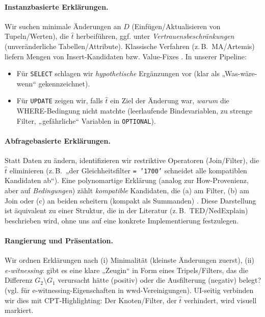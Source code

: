 \paragraph{Instanzbasierte Erklärungen.}
Wir suchen minimale Änderungen an \(D\) (Einfügen/Aktualisieren von Tupeln/Werten), die \(\hat{t}\) herbeiführen, ggf. unter \emph{Vertrauensbeschränkungen} (unveränderliche Tabellen/Attribute). Klassische Verfahren (z.\,B.\ MA/Artemis) liefern Mengen von Insert-Kandidaten bzw. Value-Fixes \cite{herschel2017survey}. In unserer Pipeline:
\begin{itemize}
  \item Für \texttt{SELECT} schlagen wir \emph{hypothetische} Ergänzungen vor (klar als „Was-wäre-wenn“ gekennzeichnet).
  \item Für \texttt{UPDATE} zeigen wir, falls \(\hat{t}\) ein Ziel der Änderung war, \emph{warum} die WHERE-Bedingung nicht matchte (leerlaufende Bindevariablen, zu strenge Filter, „gefährliche“ Variablen in \texttt{OPTIONAL}).
\end{itemize}

\paragraph{Abfragebasierte Erklärungen.}
Statt Daten zu ändern, identifizieren wir restriktive Operatoren (Join/Filter), die \(\hat{t}\) eliminieren (z.\,B.\ „der Gleichheitsfilter \texttt{= '1700'} schneidet alle kompatiblen Kandidaten ab“). Eine polynomartige Erklärung (analog zur How-Provenienz, aber auf \emph{Bedingungen}) zählt \emph{kompatible} Kandidaten, die (a) am Filter, (b) am Join oder (c) an beiden scheitern (kompakt als Summanden) \cite{herschel2017survey}. Diese Darstellung ist äquivalent zu einer Struktur, die in der Literatur (z.\,B.\ TED/NedExplain) beschrieben wird, ohne uns auf eine konkrete Implementierung festzulegen.

\paragraph{Rangierung und Präsentation.}
Wir ordnen Erklärungen nach (i) Minimalität (kleinste Änderungen zuerst), (ii) \emph{e-witnessing}: gibt es eine klare „Zeugin“ in Form eines Tripels/Filters, das die Differenz \(G_2\setminus G_1\) verursacht hätte (positiv) oder die Ausfilterung (negativ) belegt? (vgl. \cite{kaminski2016beyond} für e-witnessing-Eigenschaften in wwd-Vereinigungen). UI-seitig verbinden wir dies mit CPT-Highlighting: Der Knoten/Filter, der \(\hat{t}\) verhindert, wird visuell markiert.


